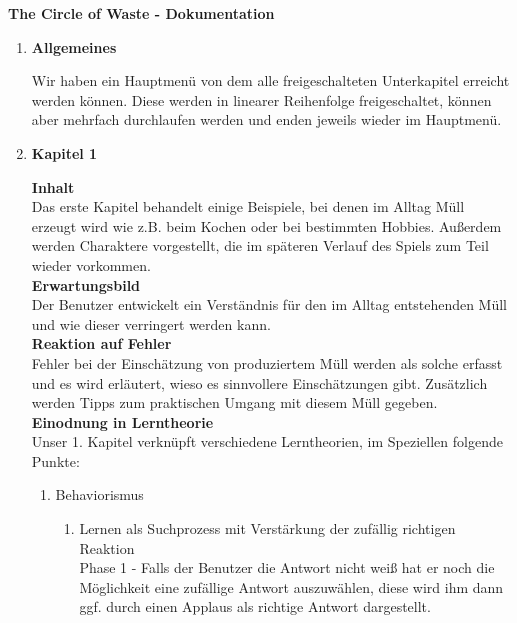 \documentclass[a4paper]{article}
\newcommand{\changefont}[3]{
\fontfamily{#1} \fontseries{#2} \fontshape{#3} \selectfont}
\newcommand{\TOP}[1]{\item \textbf{#1}\par}
\begin{document}
\changefont{cmss}{m}{n} %

\begin{center}
\textbf{\Large The Circle of Waste - Dokumentation}
\end{center}

\vspace{5mm}

\begin{enumerate}


\TOP{Allgemeines}

Wir haben ein Hauptmenü von dem alle freigeschalteten Unterkapitel erreicht werden können. Diese werden in linearer Reihenfolge freigeschaltet, können aber mehrfach durchlaufen werden und enden jeweils wieder im Hauptmenü.

\TOP{Kapitel 1}
\textbf{Inhalt}\\
Das erste Kapitel behandelt einige Beispiele, bei denen im Alltag Müll erzeugt wird wie z.B. beim Kochen oder bei bestimmten Hobbies. Außerdem werden Charaktere vorgestellt, die im späteren Verlauf des Spiels zum Teil wieder vorkommen.\\
\textbf{Erwartungsbild}\\
Der Benutzer entwickelt ein Verständnis für den im Alltag entstehenden Müll und wie dieser verringert werden kann.\\
\textbf{Reaktion auf Fehler}\\
Fehler bei der Einschätzung von produziertem Müll werden als solche erfasst und es wird erläutert, wieso es sinnvollere Einschätzungen gibt. Zusätzlich werden Tipps zum praktischen Umgang mit diesem Müll gegeben.\\
\textbf{Einodnung in Lerntheorie}\\
Unser 1. Kapitel verknüpft verschiedene Lerntheorien, im Speziellen folgende Punkte:\\
\begin{enumerate}

\item Behaviorismus
  \begin{enumerate}
    \item Lernen als Suchprozess mit Verstärkung der zufällig richtigen Reaktion\\
    Phase 1 - Falls der Benutzer die Antwort nicht weiß hat er noch die Möglichkeit eine zufällige Antwort auszuwählen, diese wird ihm dann ggf. durch einen Applaus als richtige Antwort dargestellt.
  \end{enumerate}


\end{enumerate}
\end{enumerate}
\end{document}
